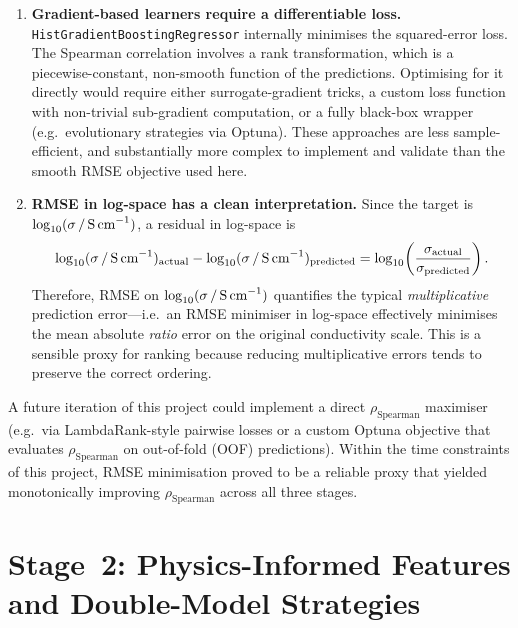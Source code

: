 \documentclass[11pt,a4paper]{article}
\newcommand{\logsigma}{\log_{10}(\sigma\,/\,\text{S\,cm}^{-1})}
\newcommand{\rhoS}{\rho_{\text{Spearman}}}
\begin{document}
\begin{enumerate}[leftmargin=*]
      \item \textbf{Gradient-based learners require a differentiable loss.}
            \texttt{HistGradientBoostingRegressor} internally minimises the
            squared-error loss. The Spearman correlation involves a rank transformation,
            which is a piecewise-constant, non-smooth function of the predictions.
            Optimising for it directly would require either surrogate-gradient tricks,
            a custom loss function with non-trivial sub-gradient computation, or a
            fully black-box wrapper (e.g.\ evolutionary strategies via Optuna).
            These approaches are less sample-efficient, and substantially more
            complex to implement and validate than the smooth RMSE objective used here.
      \item \textbf{RMSE in log-space has a clean interpretation.}
            Since the target is $\logsigma$, a residual in log-space is
            \[
                  \logsigma_{\text{actual}} - \logsigma_{\text{predicted}}
                  = \log_{10}\!\left(\frac{\sigma_{\text{actual}}}
                  {\sigma_{\text{predicted}}}\right).
            \]
            Therefore, RMSE on $\logsigma$ quantifies the typical
            \emph{multiplicative} prediction error---i.e.\ an RMSE minimiser in
            log-space effectively minimises the mean absolute \emph{ratio} error
            on the original conductivity scale.  This is a sensible proxy for
            ranking because reducing multiplicative errors tends to preserve
            the correct ordering.
\end{enumerate}

A future iteration of this project could implement a direct $\rhoS$
maximiser (e.g.\ via LambdaRank-style pairwise losses or a custom Optuna
objective that evaluates $\rhoS$ on out-of-fold (OOF) predictions).  Within the time
constraints of this project, RMSE minimisation proved to be a reliable proxy
that yielded monotonically improving $\rhoS$ across all three stages.

\section{Stage~2: Physics-Informed Features and Double-Model Strategies}
\end{document}
